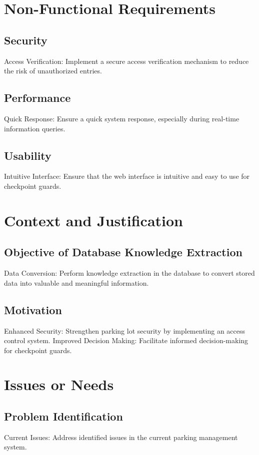 \documentclass{article}
\begin{document}
\section{Non-Functional Requirements}

\subsection{Security}
Access Verification: Implement a secure access verification mechanism to reduce the risk of unauthorized entries.

\subsection{Performance}
Quick Response: Ensure a quick system response, especially during real-time information queries.

\subsection{Usability}
Intuitive Interface: Ensure that the web interface is intuitive and easy to use for checkpoint guards.

\section{Context and Justification}

\subsection{Objective of Database Knowledge Extraction}
Data Conversion: Perform knowledge extraction in the database to convert stored data into valuable and meaningful information.

\subsection{Motivation}
Enhanced Security: Strengthen parking lot security by implementing an access control system.
Improved Decision Making: Facilitate informed decision-making for checkpoint guards.

\section{Issues or Needs}
\subsection{Problem Identification}
Current Issues: Address identified issues in the current parking management system.
\end{document}
